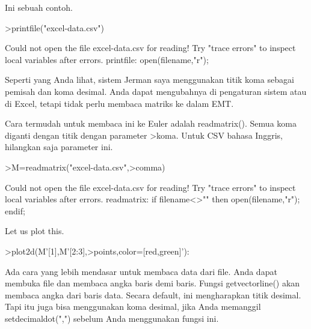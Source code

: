 \documentclass[a4paper,10pt]{article}
\begin{document}
\begin{eulernotebook}
\begin{eulercomment}
\begin{eulercomment}
\begin{eulercomment}
\begin{eulercomment}
\begin{eulercomment}
\begin{eulercomment}
\begin{eulercomment}
\begin{eulercomment}
\begin{eulercomment}
\begin{eulercomment}
\begin{eulercomment}
\begin{eulercomment}
\begin{eulercomment}
\begin{eulercomment}
\begin{eulercomment}
\begin{eulercomment}
\begin{eulercomment}
\begin{eulercomment}
\begin{eulercomment}
Ini sebuah contoh.
\end{eulercomment}
\begin{eulerprompt}
>printfile("excel-data.csv")
\end{eulerprompt}
\begin{euleroutput}
  Could not open the file
  excel-data.csv
  for reading!
  Try "trace errors" to inspect local variables after errors.
  printfile:
      open(filename,"r");
\end{euleroutput}
\begin{eulercomment}
Seperti yang Anda lihat, sistem Jerman saya menggunakan titik koma
sebagai pemisah dan koma desimal. Anda dapat mengubahnya di pengaturan
sistem atau di Excel, tetapi tidak perlu membaca matriks ke dalam EMT.

Cara termudah untuk membaca ini ke Euler adalah readmatrix(). Semua
koma diganti dengan titik dengan parameter \textgreater{}koma. Untuk CSV bahasa
Inggris, hilangkan saja parameter ini.
\end{eulercomment}
\begin{eulerprompt}
>M=readmatrix("excel-data.csv",>comma)
\end{eulerprompt}
\begin{euleroutput}
  Could not open the file
  excel-data.csv
  for reading!
  Try "trace errors" to inspect local variables after errors.
  readmatrix:
      if filename<>"" then open(filename,"r"); endif;
\end{euleroutput}
\begin{eulercomment}
Let us plot this.
\end{eulercomment}
\begin{eulerprompt}
>plot2d(M'[1],M'[2:3],>points,color=[red,green]'):
\end{eulerprompt}
\begin{eulercomment}
Ada cara yang lebih mendasar untuk membaca data dari file. Anda dapat
membuka file dan membaca angka baris demi baris. Fungsi
getvectorline() akan membaca angka dari baris data. Secara default,
ini mengharapkan titik desimal. Tapi itu juga bisa menggunakan koma
desimal, jika Anda memanggil setdecimaldot(",") sebelum Anda
menggunakan fungsi ini.


\end{eulercomment}
\end{eulercomment}
\end{eulercomment}
\end{eulercomment}
\end{eulercomment}
\end{eulercomment}
\end{eulercomment}
\end{eulercomment}
\end{eulercomment}
\end{eulercomment}
\end{eulercomment}
\end{eulercomment}
\end{eulercomment}
\end{eulercomment}
\end{eulercomment}
\end{eulercomment}
\end{eulercomment}
\end{eulercomment}
\end{eulercomment}
\end{eulernotebook}
\end{document}
